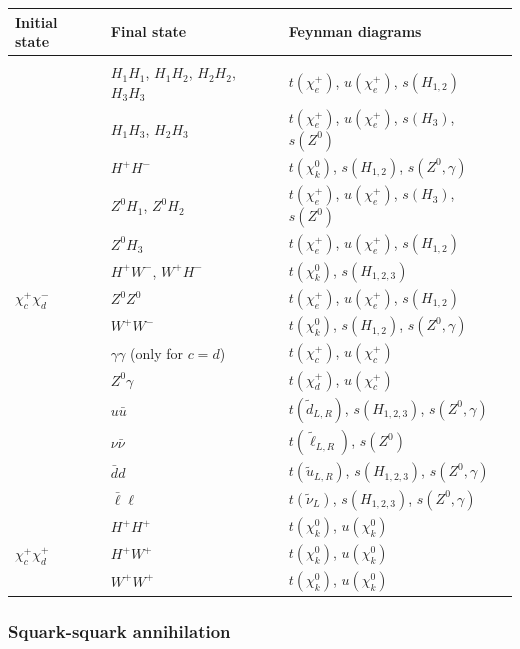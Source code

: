 \documentclass[a4paper,10pt,oneside]{book}
\newcommand{\tabspace}{\\[-2.5ex]}
\begin{document}
\begin{center} 
\begin{tabular}{lll} \hline 
  Initial state & Final state & Feynman diagrams \\ \hline \tabspace
   & $H_1 H_1$, $H_1 H_2$, $H_2 H_2$, $H_3 H_3$ &
  $t(\chi_e^+)$, $u(\chi_e^+)$, $s(H_{1,2})$ \\
   & $H_1 H_3$, $H_2 H_3$ &
  $t(\chi_e^+)$, $u(\chi_e^+)$, $s(H_{3})$, $s(Z^0)$ \\
   & $H^+ H^-$ &
  $t(\chi_k^0)$, $s(H_{1,2})$, $s(Z^0,\gamma)$ \\
   & $Z^0 H_1$, $Z^0 H_2$ &
  $t(\chi_e^+)$, $u(\chi_e^+)$, $s(H_{3})$, $s(Z^0)$ \\
   & $Z^0 H_3$ &
  $t(\chi_e^+)$, $u(\chi_e^+)$, $s(H_{1,2})$ \\
   & $H^+ W^-$, $W^+ H^-$ &
  $t(\chi_k^0)$, $s(H_{1,2,3})$ \\
  $\chi_c^+ \chi_d^-$ & $Z^0 Z^0$ &
  $t(\chi_e^+)$, $u(\chi_e^+)$, $s(H_{1,2})$ \\
   & $W^+ W^-$ &
  $t(\chi_k^0)$, $s(H_{1,2})$, $s(Z^0, \gamma)$ \\
   & $\gamma \gamma$ (only for $c=d$) &
  $t(\chi_c^+)$, $u(\chi_c^+)$ \\
   & $Z^0 \gamma$ &
  $t(\chi_d^+)$, $u(\chi_c^+)$ \\
   & $u \bar{u}$ &
  $t(\tilde{d}_{L,R})$, $s(H_{1,2,3})$, $s(Z^0, \gamma)$ \\
   & $\nu \bar{\nu}$ &
  $t(\tilde{\ell}_{L,R})$, $s(Z^0)$ \\
   & $\bar{d} d$ &
  $t(\tilde{u}_{L,R})$, $s(H_{1,2,3})$, $s(Z^0, \gamma)$ \\
   & $\bar{\ell} \ell$ &
  $t(\tilde{\nu}_{L})$, $s(H_{1,2,3})$, $s(Z^0, \gamma)$ \\ \hline
   & $H^+ H^+$ &
  $t(\chi_k^0)$, $u(\chi_k^0)$ \\
  $\chi_c^+ \chi_d^+$ & $H^+ W^+$ &
  $t(\chi_k^0)$, $u(\chi_k^0)$ \\
   & $W^+ W^+$ &
  $t(\chi_k^0)$, $u(\chi_k^0)$ \\ \hline
\end{tabular}
\end{center}


\subsubsection{Squark-squark annihilation}
\end{document}
